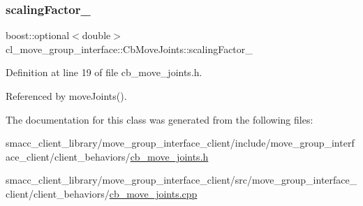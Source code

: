 \subsubsection{\texorpdfstring{scaling\+Factor\+\_\+}{scalingFactor\_}}
{\footnotesize\ttfamily boost\+::optional$<$double$>$ cl\+\_\+move\+\_\+group\+\_\+interface\+::\+Cb\+Move\+Joints\+::scaling\+Factor\+\_\+}



Definition at line 19 of file cb\+\_\+move\+\_\+joints.\+h.



Referenced by move\+Joints().



The documentation for this class was generated from the following files\+:\begin{DoxyCompactItemize}
\item 
smacc\+\_\+client\+\_\+library/move\+\_\+group\+\_\+interface\+\_\+client/include/move\+\_\+group\+\_\+interface\+\_\+client/client\+\_\+behaviors/\hyperlink{cb__move__joints_8h}{cb\+\_\+move\+\_\+joints.\+h}\item 
smacc\+\_\+client\+\_\+library/move\+\_\+group\+\_\+interface\+\_\+client/src/move\+\_\+group\+\_\+interface\+\_\+client/client\+\_\+behaviors/\hyperlink{cb__move__joints_8cpp}{cb\+\_\+move\+\_\+joints.\+cpp}\end{DoxyCompactItemize}
